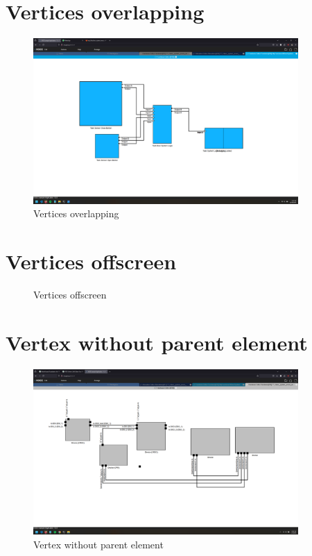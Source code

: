 \documentclass{article}
\begin{document}
\section{Vertices overlapping}
\begin{figure}[H]
    \centering
    \includegraphics[width=0.9\textwidth]{images/vertices_too_close_to_each_other.png}
    \caption{Vertices overlapping}
\end{figure}
\newpage

\section{Vertices offscreen}
\begin{figure}[H]
    \centering
    \caption{Vertices offscreen}
\end{figure}
\newpage

\section{Vertex without parent element}
\begin{figure}[H]
    \centering
    \includegraphics[width=0.9\textwidth]{images/vertex_without_parent_element.png}
    \caption{Vertex without parent element}
\end{figure}
\newpage
\end{document}
